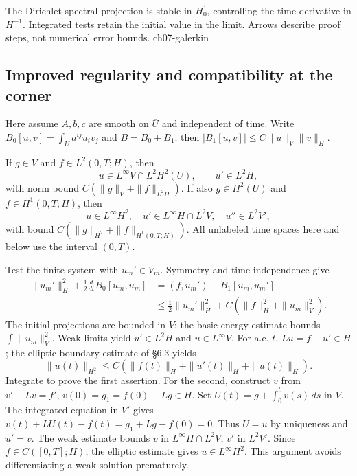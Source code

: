 {The Dirichlet spectral projection is stable in $H^1_0$, controlling the time derivative in $H^{-1}$. Integrated tests retain the initial value in the limit. Arrows describe proof steps, not numerical error bounds.}
{ch07-galerkin}

\Needspace{55mm}
\subsection{Improved regularity and compatibility at the corner}
Here assume $A,b,c$ are smooth on $\overline U$ and independent of time.
Write $B_0[u,v]=\int_Ua^{ij}u_i v_j$ and $B=B_0+B_1$;
then $|B_1[u,v]|\leq C\|u\|_V\|v\|_H$.
\Needspace{55mm}
\begin{theorem}
\label{thm:7-parabolic-regularity}
If $g\in V$ and $f\in L^2(0,T;H)$, then
\[
 u\in L^\infty V\cap L^2H^2(U),\qquad u'\in L^2H,
\]
with norm bound $C(\|g\|_V+\|f\|_{L^2H})$.
If also $g\in H^2(U)$ and $f\in H^1(0,T;H)$, then
\[
 u\in L^\infty H^2,\quad
 u'\in L^\infty H\cap L^2V,\quad u''\in L^2V',
\]
with bound $C(\|g\|_{H^2}+\|f\|_{H^1(0,T;H)})$.
All unlabeled time spaces here and below use the interval $(0,T)$.
\end{theorem}
\begin{expandedproof}
Test the finite system with $u_m'\in V_m$. Symmetry and time independence
give
\[
 \begin{split}
 \|u_m'\|_H^2+\tfrac12\tfrac d{dt}B_0[u_m,u_m]
 &=(f,u_m')-B_1[u_m,u_m']\\
 &\leq\tfrac12\|u_m'\|_H^2+C(\|f\|_H^2+\|u_m\|_V^2).
 \end{split}
\]
The initial projections are bounded in $V$; the basic energy estimate
bounds $\int\|u_m\|_V^2$. Weak limits yield $u'\in L^2H$ and
$u\in L^\infty V$. For a.e. $t$, $Lu=f-u'\in H$; the elliptic boundary
estimate of \S6.3 yields
\[
 \|u(t)\|_{H^2}\leq C(\|f(t)\|_H+\|u'(t)\|_H+\|u(t)\|_H).
\]
Integrate to prove the first assertion.
For the second, construct $v$ from $v'+Lv=f'$, $v(0)=g_1=f(0)-Lg\in H$.
Set $U(t)=g+\int_0^t v(s)\,ds$ in $V$. The integrated equation in $V'$
gives $v(t)+LU(t)-f(t)=g_1+Lg-f(0)=0$.
Thus $U=u$ by uniqueness and $u'=v$.
The weak estimate bounds $v$ in $L^\infty H\cap L^2V$, $v'$ in $L^2V'$.
Since $f\in C([0,T];H)$, the elliptic estimate gives $u\in L^\infty H^2$.
This argument avoids differentiating a weak solution prematurely.
\end{expandedproof}
\Needspace{55mm}

